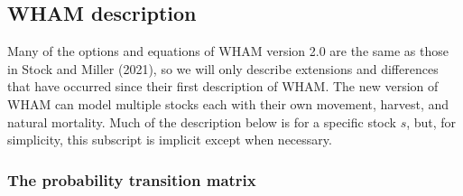 \documentclass[
]{article}
\begin{document}
\hypertarget{wham-description}{%
\subsection*{WHAM description}\label{wham-description}}

Many of the options and equations of WHAM version 2.0 are the same as those in Stock and Miller (2021), so we will only describe extensions and differences that have occurred since their first description of WHAM. The new version of WHAM can model multiple stocks each with their own movement, harvest, and natural mortality. Much of the description below is for a specific stock \(s\), but, for simplicity, this subscript is implicit except when necessary.

\hypertarget{the-probability-transition-matrix}{%
\subsubsection*{The probability transition matrix}\label{the-probability-transition-matrix}}
\end{document}
